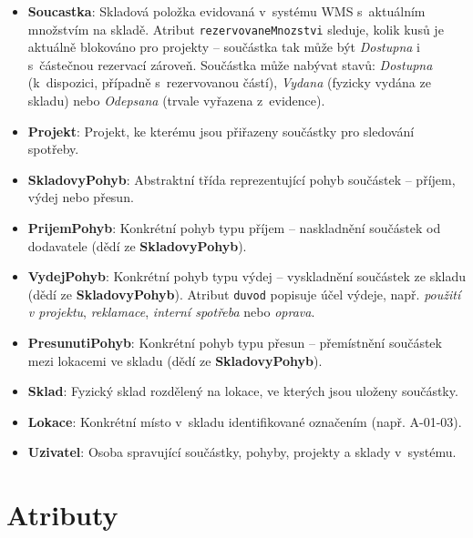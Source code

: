 \begin{itemize}
  \item \textbf{Soucastka}: Skladová položka evidovaná v~systému WMS s~aktuálním množstvím na skladě. Atribut \texttt{rezervovaneMnozstvi} sleduje, kolik kusů je aktuálně blokováno pro projekty -- součástka tak může být \textit{Dostupna} i s~částečnou rezervací zároveň. Součástka může nabývat stavů: \textit{Dostupna} (k~dispozici, případně s~rezervovanou částí), \textit{Vydana} (fyzicky vydána ze skladu) nebo \textit{Odepsana} (trvale vyřazena z~evidence).
  \item \textbf{Projekt}: Projekt, ke kterému jsou přiřazeny součástky pro sledování spotřeby.
  \item \textbf{SkladovyPohyb}: Abstraktní třída reprezentující pohyb součástek -- příjem, výdej nebo přesun.
  \item \textbf{PrijemPohyb}: Konkrétní pohyb typu příjem -- naskladnění součástek od dodavatele (dědí ze \textbf{SkladovyPohyb}).
  \item \textbf{VydejPohyb}: Konkrétní pohyb typu výdej -- vyskladnění součástek ze skladu (dědí ze \textbf{SkladovyPohyb}). Atribut \texttt{duvod} popisuje účel výdeje, např. \textit{použití v projektu}, \textit{reklamace}, \textit{interní spotřeba} nebo \textit{oprava}.
  \item \textbf{PresunutiPohyb}: Konkrétní pohyb typu přesun -- přemístnění součástek mezi lokacemi ve skladu (dědí ze \textbf{SkladovyPohyb}).
  \item \textbf{Sklad}: Fyzický sklad rozdělený na lokace, ve kterých jsou uloženy součástky.
  \item \textbf{Lokace}: Konkrétní místo v~skladu identifikované označením (např. A-01-03).
  \item \textbf{Uzivatel}: Osoba spravující součástky, pohyby, projekty a sklady v~systému.
\end{itemize}

\section{Atributy}


